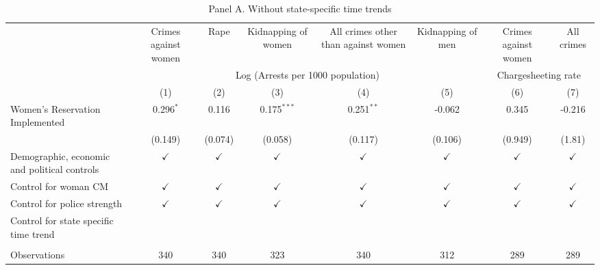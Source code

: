 
\begin{table}[htbp]
   \caption{Panel A. Without state-specific time trends}
   \bigskip
   \centering
   \begin{tabular}{lccccccc}
      \toprule
                                                    & Crimes against women & Rape          & Kidnapping of women & All crimes other than against women & Kidnapping of men & Crimes against women & All crimes\\  
       & \multicolumn{5}{c}{Log (Arrests per 1000 population)} & \multicolumn{2}{c}{Chargesheeting rate} \\ 
                                                    & (1)                  & (2)           & (3)                 & (4)                                 & (5)               & (6)                  & (7)\\  
      \midrule 
      Women's Reservation Implemented               & 0.296$^{*}$          & 0.116         & 0.175$^{***}$       & 0.251$^{**}$                        & -0.062            & 0.345                & -0.216\\   
                                                    & (0.149)              & (0.074)       & (0.058)             & (0.117)                             & (0.106)           & (0.949)              & (1.81)\\   
      Demographic, economic  and political controls & $\checkmark$         & $\checkmark$  & $\checkmark$        & $\checkmark$                        & $\checkmark$      & $\checkmark$         & $\checkmark$\\   
      Control for woman CM                          & $\checkmark$         & $\checkmark$  & $\checkmark$        & $\checkmark$                        & $\checkmark$      & $\checkmark$         & $\checkmark$\\   
      Control for police strength                   & $\checkmark$         & $\checkmark$  & $\checkmark$        & $\checkmark$                        & $\checkmark$      & $\checkmark$         & $\checkmark$\\   
      Control for state specific time trend         &                      &               &                     &                                     &                   &                      & \\  
       \\
      Observations                                  & 340                  & 340           & 323                 & 340                                 & 312               & 289                  & 289\\  

\end{tabular}
\end{table}
